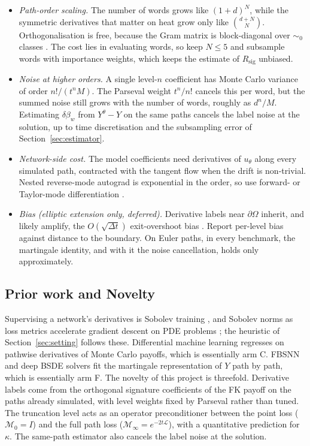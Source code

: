 \documentclass[english]{article}
\begin{document}
\begin{itemize}
  \item \emph{Path-order scaling.} The number of words grows like $(1+d)^N$, while the symmetric derivatives that matter on heat grow only like $\binom{d+N}{N}$. Orthogonalisation is free, because the Gram matrix is block-diagonal over $\sim_0$ classes \cite{chevyrev2026orthogonal}. The cost lies in evaluating words, so keep $N\le5$ and subsample words with importance weights, which keeps the estimate of $R_\mathrm{sig}$ unbiased.
  \item \emph{Noise at higher orders.} A single level-$n$ coefficient has Monte Carlo variance of order $n!/(t^nM)$. The Parseval weight $t^n/n!$ cancels this per word, but the summed noise still grows with the number of words, roughly as $d^n/M$. Estimating $\delta\beta_w$ from $Y^\theta - Y$ on the same paths cancels the label noise at the solution, up to time discretisation and the subsampling error of Section~\ref{sec:estimator}.
  \item \emph{Network-side cost.} The model coefficients need derivatives of $u_\theta$ along every simulated path, contracted with the tangent flow when the drift is non-trivial. Nested reverse-mode autograd is exponential in the order, so use forward- or Taylor-mode differentiation \cite{bettencourt2019taylor}. 
  \item \emph{Bias (elliptic extension only, deferred).} Derivative labels near $\partial\Omega$ inherit, and likely amplify, the $O(\sqrt{\Delta t})$ exit-overshoot bias \cite{gobet2000killed}. Report per-level bias against distance to the boundary. On Euler paths, in every benchmark, the martingale identity, and with it the noise cancellation, holds only approximately.
\end{itemize}

\subsection{Prior work and Novelty}
Supervising a network's derivatives is Sobolev training \cite{czarnecki2017sobolev}, and Sobolev norms as loss metrics accelerate gradient descent on PDE problems \cite{lu2022sobolev,son2021sobolev}; the heuristic of Section~\ref{sec:setting} follows these. Differential machine learning \cite{huge2020differential} regresses on pathwise derivatives of Monte Carlo payoffs, which is essentially arm C. FBSNN \cite{raissi2018fbsnn} and deep BSDE solvers \cite{han2018deepbsde} fit the martingale representation of $Y$ path by path, which is essentially arm F. The novelty of this project is threefold. Derivative labels come from the orthogonal signature coefficients of the FK payoff on the paths already simulated, with level weights fixed by Parseval rather than tuned. The truncation level acts as an operator preconditioner \cite{deryck2024operator} between the point loss ($\mathcal M_0 = I$) and the full path loss ($\mathcal M_\infty = e^{-2t\mathcal L}$), with a quantitative prediction for $\kappa$. The same-path estimator also cancels the label noise at the solution.
\end{document}
